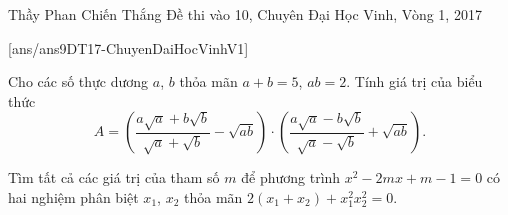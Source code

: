\begin{name}
{Thầy  Phan Chiến Thắng}
{Đề thi vào 10, Chuyên Đại Học Vinh, Vòng 1, 2017}
\end{name}
\setcounter{ex}{0}
[ans/ans9DT17-ChuyenDaiHocVinhV1]
\begin{ex}%
Cho các số thực dương $a$, $b$ thỏa mãn $a+b=5$, $ab=2$. Tính giá trị của biểu thức $$A=\left(\dfrac{a\sqrt{a}+b\sqrt{b}}{\sqrt{a}+\sqrt{b}}-\sqrt{ab}\right)\cdot\left(\dfrac{a\sqrt{a}-b\sqrt{b}}{\sqrt{a}-\sqrt{b}}+\sqrt{ab}\right).$$
\end{ex}

\begin{ex}%
Tìm tất cả các giá trị của tham số $m$ để phương trình $x^2-2mx+m-1=0$ có hai nghiệm phân biệt $x_1$, $x_2$ thỏa mãn $2\left(x_1+x_2\right)+x_1^2x_2^2=0$.
\end{ex}

